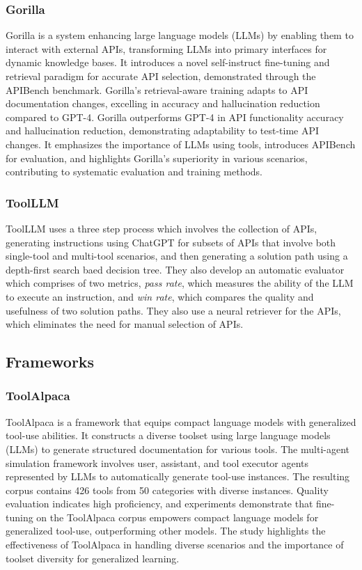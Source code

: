 \documentclass[10pt,twocolumn,letterpaper]{article}
\begin{document}
\subsubsection{Gorilla \cite{patil2023gorilla}}Gorilla is a system enhancing large language models (LLMs) by enabling them to interact with external APIs, transforming LLMs into primary interfaces for dynamic knowledge bases. It introduces a novel self-instruct fine-tuning and retrieval paradigm for accurate API selection, demonstrated through the APIBench benchmark. Gorilla's retrieval-aware training adapts to API documentation changes, excelling in accuracy and hallucination reduction compared to GPT-4. Gorilla outperforms GPT-4 in API functionality accuracy and hallucination reduction, demonstrating adaptability to test-time API changes. It emphasizes the importance of LLMs using tools, introduces APIBench for evaluation, and highlights Gorilla's superiority in various scenarios, contributing to systematic evaluation and training methods.

\subsubsection{ToolLLM\cite{qin2023toolllm}} ToolLLM uses a three step process which involves the collection of APIs, generating instructions using ChatGPT for subsets of APIs that involve both single-tool and multi-tool scenarios, and then generating a solution path using a depth-first search baed decision tree. They also develop an automatic evaluator which comprises of two metrics, \textit{pass rate}, which measures the ability of the LLM to execute an instruction, and \textit{win rate}, which compares the quality and usefulness of two solution paths. They also use a neural retriever for the APIs, which eliminates the need for manual selection of APIs.
\subsection{Frameworks}
\subsubsection{ToolAlpaca \cite{tang2023toolalpaca}}
ToolAlpaca is a framework that equips compact language models with generalized tool-use abilities. It constructs a diverse toolset using large language models (LLMs) to generate structured documentation for various tools. The multi-agent simulation framework involves user, assistant, and tool executor agents represented by LLMs to automatically generate tool-use instances. The resulting corpus contains 426 tools from 50 categories with diverse instances. Quality evaluation indicates high proficiency, and experiments demonstrate that fine-tuning on the ToolAlpaca corpus empowers compact language models for generalized tool-use, outperforming other models. The study highlights the effectiveness of ToolAlpaca in handling diverse scenarios and the importance of toolset diversity for generalized learning.
\end{document}
